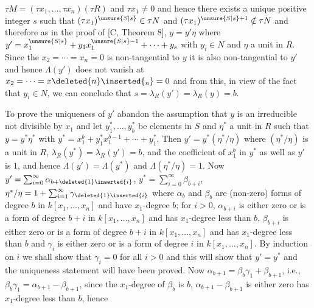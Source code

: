 $\tau M=(\tau x_1,\ldots,\tau x_n)(\tau R)$ and $\tau x_1\ne0$ and hence there exists a unique positive integer $s$ such that $(\tau x_1)^{\unsure{S|s}}\in\tau N$ and $(\tau x_1)^{\unsure{S|s}+1}\notin\tau N$ and therefore as in the proof of [C, Theorem 8],
$y=y'\eta$ where $y'=x_1^{\unsure{S|s}}+y_1x_1^{\unsure{S|s}-1}+\cdots+y_s$ with $y_i\in N$ and $\eta$ a unit in $R$. Since the  $x_2=\cdots=x_n=0$ is non-tangential to $y$ it is also non-tangential to $y'$ and hence $\Lambda(y')$ does not vanish at $x_2=\cdots=x\deleted{n}\inserted{{}_n}=0$ and from this, in view of the fact that $y_i\in N$, we can conclude that $s=\lambda_R(y')=\lambda_R(y)=b$.

To prove the uniqueness of $y'$ abandon the assumption that $y$ is an irreducible not divisible by $x_1$ and let $y_1^*,\ldots,y_b^*$ be elements in $S$ and $\eta^*$ a unit in $R$ such that $y=y^*\eta^*$ with $y^*=x_1^b+y_1^*x_1^{b-1}+\cdots+y_1^*$. Then $y'=y^*(\eta^*/\eta)$ where $(\eta^*/\eta)$ is a unit in $R$, $\lambda_R(y^*)=\lambda_R(y')=b$, and the coefficient of $x_1^b$ in $y^*$ as well as $y'$ is $1$, and hence $\Lambda(y')=\Lambda(y^*)$ and $\Lambda(\eta^*/\eta)=1$. Now $y'=\sum_{i=0}^\infty\alpha_{b+\deleted{1}\inserted{i}}$, $y^*=\sum_{i=0}^\infty\beta_{b+i}$, $\eta^*/\eta=1+\sum_{i=1}^\infty\gamma_{\deleted{1}\inserted{i}}$ where $\alpha_b$ and $\beta_b$ are (non-zero) forms of degree $b$ in $k[x_1,\ldots,x_n]$ and have $x_1$-degree $b$; for $i>0$, $\alpha_{b+i}$ is either zero or is a form of degree $b+i$ in $k[x_1,\ldots,x_n]$ and has $x_1$-degree less than $b$, $\beta_{b+i}$ is either zero or is a form of degree $b+i$ in $k[x_1,\ldots,x_n]$ and has $x_1$-degree less than $b$ and $\gamma_i$ is either zero or is a form of degree $i$ in $k[x_1,\ldots,x_n]$. By induction on $i$ we shall show that $\gamma_i=0$ for all $i>0$ and this will show that $y'=y^*$ and the uniqueness statement will have been proved. Now $\alpha_{b+1}=\beta_b\gamma_1+\beta_{b+1}$, i.e., $\beta_b\gamma_1=\alpha_{b+1}-\beta_{b+1}$, since the $x_1$-degree of $\beta_b$ is $b$, $\alpha_{b+1}-\beta_{b+1}$ is either zero has $x_1$-degree less than $b$, hence

